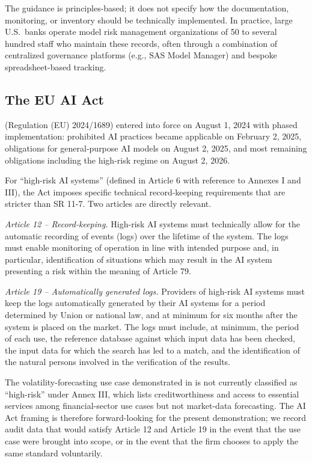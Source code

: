 The guidance is principles-based; it does not specify how the documentation, monitoring, or inventory should be technically implemented. In practice, large U.S.\ banks operate model risk management organizations of 50 to several hundred staff who maintain these records, often through a combination of centralized governance platforms (e.g., SAS Model Manager) and bespoke spreadsheet-based tracking.

\subsection{The EU AI Act}\label{sec:euaiact}

\citet{EUAIAct} (Regulation (EU) 2024/1689) entered into force on August 1, 2024 with phased implementation: prohibited AI practices became applicable on February 2, 2025, obligations for general-purpose AI models on August 2, 2025, and most remaining obligations including the high-risk regime on August 2, 2026.

For ``high-risk AI systems'' (defined in Article 6 with reference to Annexes I and III), the Act imposes specific technical record-keeping requirements that are stricter than SR 11-7. Two articles are directly relevant.

\textit{Article 12 -- Record-keeping.} High-risk AI systems must technically allow for the automatic recording of events (logs) over the lifetime of the system. The logs must enable monitoring of operation in line with intended purpose and, in particular, identification of situations which may result in the AI system presenting a risk within the meaning of Article 79.

\textit{Article 19 -- Automatically generated logs.} Providers of high-risk AI systems must keep the logs automatically generated by their AI systems for a period determined by Union or national law, and at minimum for six months after the system is placed on the market. The logs must include, at minimum, the period of each use, the reference database against which input data has been checked, the input data for which the search has led to a match, and the identification of the natural persons involved in the verification of the results.

The volatility-forecasting use case demonstrated in  is not currently classified as ``high-risk'' under Annex III, which lists creditworthiness and access to essential services among financial-sector use cases but not market-data forecasting. The AI Act framing is therefore forward-looking for the present demonstration; we record audit data that would satisfy Article 12 and Article 19 in the event that the use case were brought into scope, or in the event that the firm chooses to apply the same standard voluntarily.


